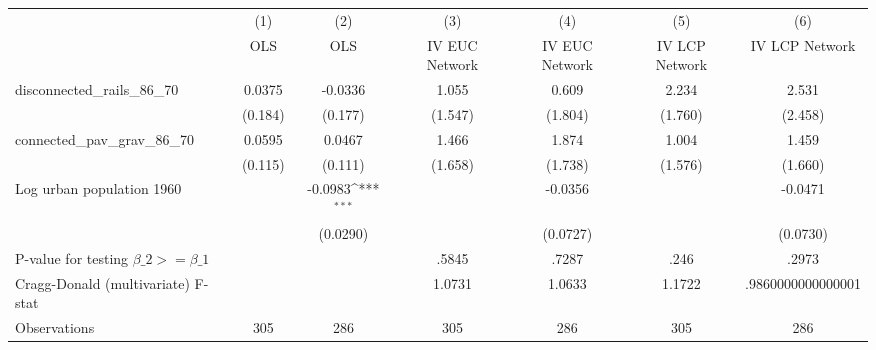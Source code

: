 {
\def\sym#1{\ifmmode^{#1}\else\(^{#1}\)\fi}
\begin{tabular}{l*{6}{c}}
\hline\hline
                &\multicolumn{1}{c}{(1)}&\multicolumn{1}{c}{(2)}&\multicolumn{1}{c}{(3)}&\multicolumn{1}{c}{(4)}&\multicolumn{1}{c}{(5)}&\multicolumn{1}{c}{(6)}\\
                &\multicolumn{1}{c}{OLS}&\multicolumn{1}{c}{OLS}&\multicolumn{1}{c}{IV EUC Network}&\multicolumn{1}{c}{IV EUC Network}&\multicolumn{1}{c}{IV LCP Network}&\multicolumn{1}{c}{IV LCP Network}\\
\hline
disconnected\_rails\_86\_70&   0.0375         &  -0.0336         &    1.055         &    0.609         &    2.234         &    2.531         \\
                &  (0.184)         &  (0.177)         &  (1.547)         &  (1.804)         &  (1.760)         &  (2.458)         \\
[1em]
connected\_pav\_grav\_86\_70&   0.0595         &   0.0467         &    1.466         &    1.874         &    1.004         &    1.459         \\
                &  (0.115)         &  (0.111)         &  (1.658)         &  (1.738)         &  (1.576)         &  (1.660)         \\
[1em]
Log urban population 1960&                  &  -0.0983\sym{***}&                  &  -0.0356         &                  &  -0.0471         \\
                &                  & (0.0290)         &                  & (0.0727)         &                  & (0.0730)         \\
\hline
P-value for testing $\beta\_{2} >= \beta\_{1}$&                  &                  &    .5845         &    .7287         &     .246         &    .2973         \\
Cragg-Donald (multivariate) F-stat&                  &                  &   1.0731         &   1.0633         &   1.1722         &.9860000000000001         \\
Observations    &      305         &      286         &      305         &      286         &      305         &      286         \\
\hline\hline
\end{tabular}
}
